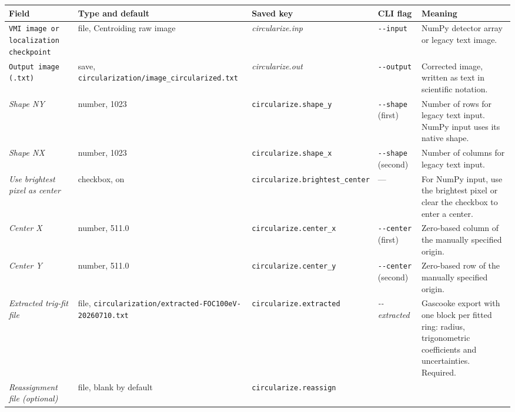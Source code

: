 \documentclass[11pt,a4paper]{article}
\newcommand{\code}[1]{\texttt{#1}}
\begin{document}
\begin{center}
\footnotesize
\begin{longtable}{@{}L{3.4cm}L{2.3cm}L{2.5cm}L{2.8cm}L{4.9cm}@{}}
\toprule
Field & Type and default & Saved key & CLI flag & Meaning \\
\midrule
\endhead
\bottomrule
\endfoot
\code{VMI image or localization checkpoint} & file, Centroiding raw image &
\emph{circularize.inp} & \code{-\allowbreak{}-\allowbreak{}input} & NumPy detector array or legacy text image. \\
\addlinespace
\code{Output image (.txt)} & save, \code{circularization/\allowbreak{}image\_\allowbreak{}circularized.\allowbreak{}txt} &
\emph{circularize.out} & \code{-\allowbreak{}-\allowbreak{}output} & Corrected image, written as text
in scientific notation. \\
\addlinespace
\emph{Shape NY} & number, 1023 & \code{circularize.\allowbreak{}shape\_\allowbreak{}y} & \code{-\allowbreak{}-\allowbreak{}shape} (first) &
Number of rows for legacy text input. NumPy input uses its native shape. \\
\addlinespace
\emph{Shape NX} & number, 1023 & \code{circularize.\allowbreak{}shape\_\allowbreak{}x} & \code{-\allowbreak{}-\allowbreak{}shape} (second) &
Number of columns for legacy text input. \\
\addlinespace
\emph{Use brightest pixel as center} & checkbox, on & \code{circularize.\allowbreak{}brightest\_\allowbreak{}center} & --- &
For NumPy input, use the brightest pixel or clear the checkbox to enter a center. \\
\addlinespace
\emph{Center X} & number, 511.0 & \code{circularize.\allowbreak{}center\_\allowbreak{}x} & \code{-\allowbreak{}-\allowbreak{}center} (first) &
Zero-based column of the manually specified origin. \\
\addlinespace
\emph{Center Y} & number, 511.0 & \code{circularize.\allowbreak{}center\_\allowbreak{}y} & \code{-\allowbreak{}-\allowbreak{}center} (second) &
Zero-based row of the manually specified origin. \\
\addlinespace
\emph{Extracted trig-\allowbreak{}fit file} & file,
\code{circularization/\allowbreak{}extracted-\allowbreak{}FOC100eV-\allowbreak{}20260710.txt} & \code{circularize.\allowbreak{}extracted} &
\emph{-\allowbreak{}-\allowbreak{}extracted} & Gascooke export with one block per fitted ring: radius,
trigonometric coefficients and uncertainties. Required. \\
\addlinespace
\emph{Reassignment file (optional)} & file, blank by default & \code{circularize.\allowbreak{}reassign} &

\end{longtable}
\end{center}
\end{document}
